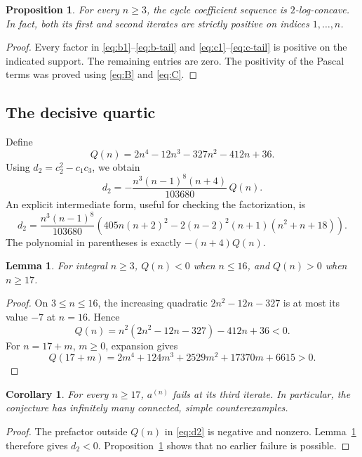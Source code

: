 \documentclass[11pt,a4paper]{article}
\newtheorem{proposition}[theorem]{Proposition}
\newtheorem{lemma}[theorem]{Lemma}
\newtheorem{corollary}[theorem]{Corollary}
\theoremstyle{definition}
\newcommand{\aco}{a^{(n)}}
\begin{document}
\begin{proposition}\label{prop:2LC}
For every $n\ge3$, the cycle coefficient sequence is $2$-log-concave.
In fact, both its first and second iterates are strictly positive on
indices $1,\ldots,n$.
\end{proposition}
\begin{proof}
Every factor in \eqref{eq:b1}--\eqref{eq:b-tail} and
\eqref{eq:c1}--\eqref{eq:c-tail} is positive on the indicated support.
The remaining entries are zero. The positivity of the Pascal terms was
proved using \eqref{eq:B} and \eqref{eq:C}.
\end{proof}

\subsection{The decisive quartic}
Define
\begin{equation}\label{eq:Q}
 Q(n)=2n^4-12n^3-327n^2-412n+36.
\end{equation}
Using $d_2=c_2^2-c_1c_3$, we obtain
\begin{equation}\label{eq:d2}
 \boxed{\displaystyle
 d_2=-\frac{n^3(n-1)^8(n+4)}{103680}\,Q(n).}
\end{equation}
An explicit intermediate form, useful for checking the factorization, is
\[
 d_2=\frac{n^3(n-1)^8}{103680}
 \left(405n(n+2)^2
  -2(n-2)^2(n+1)(n^2+n+18)\right).
\]
The polynomial in parentheses is exactly $-(n+4)Q(n)$.

\begin{lemma}\label{lem:Qsign}
For integral $n\ge3$, $Q(n)<0$ when $n\le16$, and $Q(n)>0$ when $n\ge17$.
\end{lemma}
\begin{proof}
On $3\le n\le16$, the increasing quadratic
$2n^2-12n-327$ is at most its value $-7$ at $n=16$. Hence
\[
 Q(n)=n^2(2n^2-12n-327)-412n+36<0.
\]
For $n=17+m$, $m\ge0$, expansion gives
\begin{equation}\label{eq:Qshift}
 Q(17+m)=2m^4+124m^3+2529m^2+17370m+6615>0.
\end{equation}
\end{proof}

\begin{corollary}\label{cor:infinitefamily}
For every $n\ge17$, $\aco$ fails at its third iterate. In particular,
the conjecture has infinitely many connected, simple counterexamples.
\end{corollary}
\begin{proof}
The prefactor outside $Q(n)$ in \eqref{eq:d2} is negative and nonzero.
Lemma~\ref{lem:Qsign} therefore gives $d_2<0$. Proposition~\ref{prop:2LC}
shows that no earlier failure is possible.
\end{proof}
\end{document}
